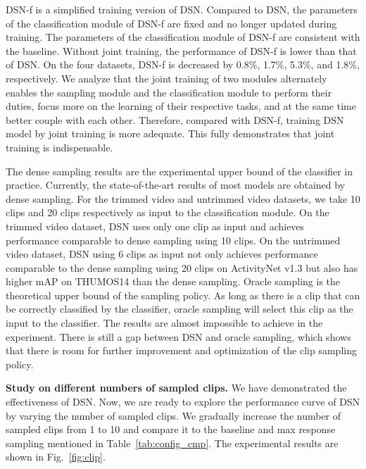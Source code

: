 \documentclass[journal]{IEEEtran}
\begin{document}
DSN-f is a simplified training version of DSN.
Compared to DSN, the parameters of the classification module of DSN-f are fixed and no longer updated during training.
The parameters of the classification module of DSN-f are consistent with the baseline.
Without joint training, the performance of DSN-f is lower than that of DSN.
On the four datasets, DSN-f is decreased by 0.8\%, 1.7\%, 5.3\%, and 1.8\%, respectively.
We analyze that the joint training of two modules alternately enables the sampling module and the classification module to perform their duties, focus more on the learning of their respective tasks, and at the same time better couple with each other.
Therefore, compared with DSN-f, training DSN model by joint training is more adequate.
This fully demonstrates that joint training is indispensable.


The dense sampling results are the experimental upper bound of the classifier in practice.
Currently, the state-of-the-art results of most models are obtained by dense sampling.
For the trimmed video and untrimmed video datasets, we take 10 clips and 20 clips respectively as input to the classification module.
On the trimmed video dataset, DSN uses only one clip as input and achieves performance comparable to dense sampling using 10 clips.
On the untrimmed video dataset, DSN using 6 clips as input not only achieves performance comparable to the dense sampling using 20 clips on ActivityNet v1.3 but also has higher mAP on THUMOS14 than the dense sampling.
Oracle sampling is the theoretical upper bound of the sampling policy.
As long as there is a clip that can be correctly classified by the classifier, oracle sampling will select this clip as the input to the classifier.
The results are almost impossible to achieve in the experiment.
There is still a gap between DSN and oracle sampling, which shows that there is room for further improvement and optimization of the clip sampling policy.


\textbf{Study on different numbers of sampled clips.}
We have demonstrated the effectiveness of DSN.
Now, we are ready to explore the performance curve of DSN by varying the number of sampled clips.
We gradually increase the number of sampled clips from 1 to 10 and compare it to the baseline and max response sampling mentioned in Table~\ref{tab:config_cmp}.
The experimental results are shown in Fig.~\ref{fig:clip}.
\end{document}
